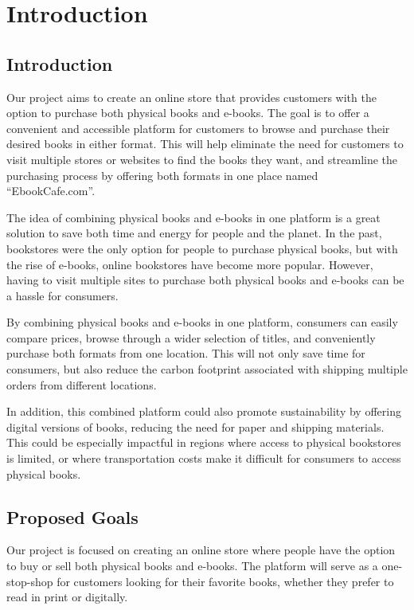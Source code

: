 \documentclass[12pt,a4paper]{article}
\begin{document}
\pagebreak
\tableofcontents
\pagebreak

\clearpage
{}
\section{Introduction}
\subsection{Introduction}
Our project aims to create an online store that provides customers with the option to purchase both physical books and e-books. The goal is to offer a convenient and accessible platform for customers to browse and purchase their desired books in either format. This will help eliminate the need for customers to visit multiple stores or websites to find the books they want, and streamline the purchasing process by offering both formats in one place named “EbookCafe.com”.

The idea of combining physical books and e-books in one platform is a great solution to save both time and energy for people and the planet. In the past, bookstores were the only option for people to purchase physical books, but with the rise of e-books, online bookstores have become more popular. However, having to visit multiple sites to purchase both physical books and e-books can be a hassle for consumers.

By combining physical books and e-books in one platform, consumers can easily compare prices, browse through a wider selection of titles, and conveniently purchase both formats from one location. This will not only save time for consumers, but also reduce the carbon footprint associated with shipping multiple orders from different locations.

In addition, this combined platform could also promote sustainability by offering digital versions of books, reducing the need for paper and shipping materials. This could be especially impactful in regions where access to physical bookstores is limited, or where transportation costs make it difficult for consumers to access physical books.
\subsection{Proposed Goals}
Our project is focused on creating an online store where people have the option to buy or sell both physical books and e-books. The platform will serve as a one-stop-shop for customers looking for their favorite books, whether they prefer to read in print or digitally.
\end{document}
